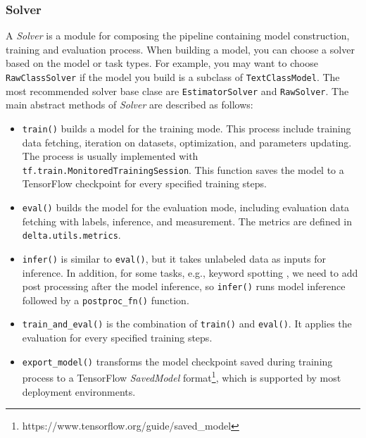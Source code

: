 \documentclass{article}
\begin{document}
\subsubsection{Solver}
    A \textit{Solver} is a module for composing the pipeline containing model construction, training and evaluation process. When building a model, you can choose a solver based on the model or task types. For example, you may want to choose \texttt{RawClassSolver} if the model you build is a subclass of \texttt{TextClassModel}. The most recommended solver base clase are \texttt{EstimatorSolver} and \texttt{RawSolver}. The main abstract methods of \textit{Solver} are described as follows:

    \begin{itemize}
        \item \texttt{train()} builds a model for the training mode. This process include training data fetching, iteration on datasets, optimization, and parameters updating. The process is usually implemented with \texttt{tf.train.MonitoredTrainingSession}. This function saves the model to a TensorFlow checkpoint for every specified training steps.

        \item \texttt{eval()} builds the model for the evaluation mode, including evaluation data fetching with labels, inference, and measurement. The metrics are defined in \texttt{delta.utils.metrics}.


        \item \texttt{infer()} is similar to \texttt{eval()}, but it takes unlabeled data as inputs for inference. In addition, for some tasks, e.g., keyword spotting \citep{chen2014kws}, we need to add post processing after the model inference, so \texttt{infer()} runs model inference followed by a \texttt{postproc_fn()} function.

        \item \texttt{train_and_eval()} is the combination of \texttt{train()} and \texttt{eval()}. It applies the evaluation for every specified training steps.

        \item \texttt{export_model()} transforms the model checkpoint saved during training process to a TensorFlow \textit{SavedModel} format\footnote{https://www.tensorflow.org/guide/saved\_model}, which is supported by most deployment environments.
    \end{itemize}
\end{document}
